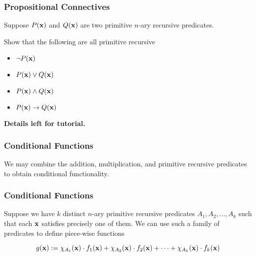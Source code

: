 \documentclass{beamer}
\theoremstyle{indentDefn} \newtheorem{defn}[]{Definition}
\begin{document}
\begin{frame}
	\frametitle{Propositional Connectives}

	Suppose $P({\bf x})$ and $Q({\bf x})$ are two primitive $n$-ary recursive predicates.

	\vspace{0.5cm}

	Show that the following are all primitive recursive

	\begin{itemize}
		\item[] $\lnot P({\bf x})$
		\item[] $P({\bf x}) \lor Q({\bf x})$ 
		\item[] $P({\bf x}) \land Q({\bf x})$ 
		\item[] $P({\bf x}) \to Q({\bf x})$
	\end{itemize}

	\vspace{3.8cm}

	\hspace{6cm} {\bf Details left for tutorial.}

\end{frame}



\begin{frame}
	\frametitle{Conditional Functions}

	We may combine the addition, multiplication, and primitive recursive predicates to obtain conditional functionality. 

	\vspace{7cm}

\end{frame}

\begin{frame}
	\frametitle{Conditional Functions}

	Suppose we have $k$ distinct $n$-ary primitive recursive predicates $A_{1}, A_{2},\dots , A_{k}$ such that each ${\bf x}$ satisfies precisely one of them. We can use such a family of predicates to define piece-wise functions

	\vspace{0.5cm}

	$$g({\bf x}):= \chi_{A_{1}}({\bf x}) \cdot f_{1}({\bf x}) + \chi_{A_{2}}({\bf x}) \cdot f_{2}({\bf x}) + \cdots + \chi_{A_{k}}({\bf x}) \cdot f_{k}({\bf x})$$

	\vspace{6cm}


\end{frame}
\end{document}
